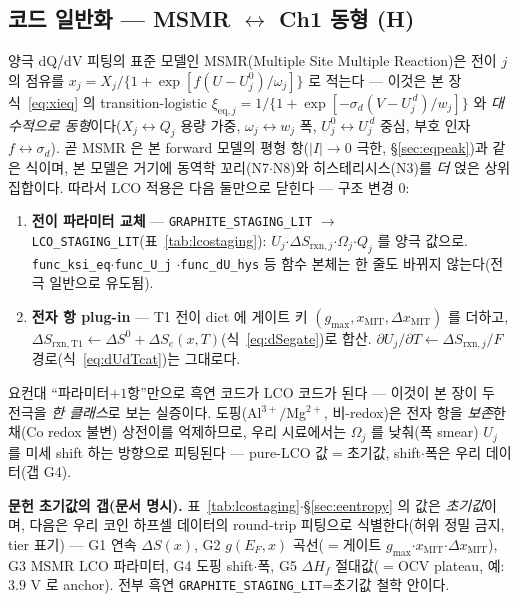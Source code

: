 \documentclass[11pt,a4paper]{article}
\newcommand{\eq}{\mathrm{eq}}
\newcommand{\rxn}{\mathrm{rxn}}
\newcommand{\MIT}{\mathrm{MIT}}
\newcommand{\code}[1]{\texttt{#1}}
\begin{document}
\subsection{코드 일반화 — MSMR $\leftrightarrow$ Ch1 동형 (H)}\label{sub:msmr}
양극 dQ/dV 피팅의 표준 모델인 MSMR(Multiple Site Multiple Reaction)\cite{verbrugge2017}은 전이 $j$ 의 점유를
$x_j=X_j/\{1+\exp[f(U-U_j^0)/\omega_j]\}$ 로 적는다 — 이것은 본 장 식~\eqref{eq:xieq} 의 transition-logistic
$\xi_{\eq,j}=1/\{1+\exp[-\sigma_d(V-U_j^{\,d})/w_j]\}$ 와 \emph{대수적으로 동형}이다($X_j\!\leftrightarrow\!Q_j$ 용량 가중,
$\omega_j\!\leftrightarrow\!w_j$ 폭, $U_j^0\!\leftrightarrow\!U_j^{\,d}$ 중심, 부호 인자 $f\!\leftrightarrow\!\sigma_d$).
곧 MSMR 은 본 forward 모델의 평형 항($|I|\to0$ 극한, \S\ref{sec:eqpeak})과 같은 식이며, 본 모델은 거기에 동역학
꼬리(N7$\cdot$N8)와 히스테리시스(N3)를 \emph{더} 얹은 상위 집합이다. 따라서 LCO 적용은 다음 둘만으로 닫힌다 —
구조 변경 $0$:
\begin{enumerate}[label=(\roman*),leftmargin=2.0em,itemsep=1pt,topsep=1pt]
\item \textbf{전이 파라미터 교체} — \code{GRAPHITE\_STAGING\_LIT} $\to$ \code{LCO\_STAGING\_LIT}(표~\ref{tab:lcostaging}):
$U_j$$\cdot$$\Delta S_{\rxn,j}$$\cdot$$\Omega_j$$\cdot$$Q_j$ 를 양극 값으로. \code{func\_ksi\_eq}$\cdot$\code{func\_U\_j}
$\cdot$\code{func\_dU\_hys} 등 함수 본체는 한 줄도 바뀌지 않는다(전극 일반으로 유도됨).
\item \textbf{전자 항 plug-in} — T1 전이 dict 에 게이트 키 $(g_{\max},x_\MIT,\Delta x_\MIT)$ 를 더하고,
$\Delta S_{\rxn,\text{T1}}\leftarrow\Delta S^0+\Delta S_e(x,T)$(식~\eqref{eq:dSegate})로 합산. $\partial U_j/\partial T
\leftarrow\Delta S_{\rxn,j}/F$ 경로(식~\eqref{eq:dUdTcat})는 그대로다.
\end{enumerate}
요컨대 ``파라미터$+1$항''만으로 흑연 코드가 LCO 코드가 된다 — 이것이 본 장이 두 전극을 \emph{한 클래스}로 보는 실증이다.
도핑(Al$^{3+}/$Mg$^{2+}$, 비-redox)은 전자 항을 \emph{보존}한 채(Co redox 불변) 상전이를 억제하므로, 우리 시료에서는
$\Omega_j$ 를 낮춰(폭 smear) $U_j$ 를 미세 shift 하는 방향으로 피팅된다 — pure-LCO 값$=$초기값, shift$\cdot$폭은 우리
데이터(갭 G4).

\textbf{문헌 초기값의 갭(문서 명시).} 표~\ref{tab:lcostaging}$\cdot$\S\ref{sec:eentropy} 의 값은 \emph{초기값}이며,
다음은 우리 코인 하프셀 데이터의 round-trip 피팅으로 식별한다(허위 정밀 금지, tier 표기) — G1 연속 $\Delta S(x)$,
G2 $g(E_F,x)$ 곡선($=$게이트 $g_{\max}$$\cdot$$x_\MIT$$\cdot$$\Delta x_\MIT$), G3 MSMR LCO 파라미터,
G4 도핑 shift$\cdot$폭, G5 $\Delta H_f$ 절대값($=$OCV plateau, 예: $3.9$ V 로 anchor). 전부 흑연
\code{GRAPHITE\_STAGING\_LIT}=초기값 철학 안이다.
\end{document}
